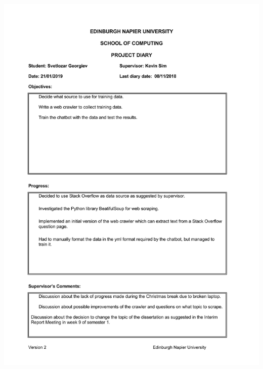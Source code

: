 \documentclass[12pt,a4paper]{article}
\begin{document}
\begin{appendices}
\newpage
\includegraphics[width=\textwidth,height=\textheight,keepaspectratio]{s2week2.jpg} %
\newpage

\end{appendices}
\end{document}
